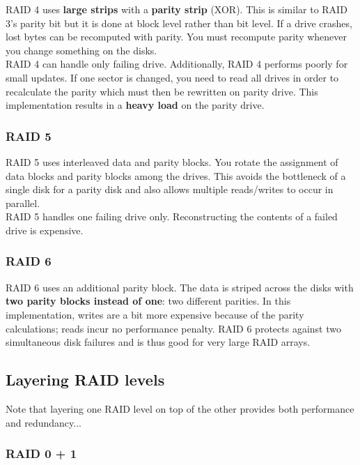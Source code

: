\documentclass{article}
\newcommand{\bold}[1]{\textbf{#1}}
\begin{document}
RAID 4 uses \bold{large strips} with a \bold{parity strip} (XOR). This is similar to RAID 3's parity bit but it is done at block level rather than bit level. If a drive crashes, lost bytes can be recomputed with parity. You must recompute parity whenever you change something on the disks. \\ 

RAID 4 can handle only failing drive. Additionally, RAID 4 performs poorly for small updates. If one sector is changed, you need to read all drives in order to recalculate the parity which must then be rewritten on parity drive. This implementation results in a \bold{heavy load} on the parity drive. 

\subsubsection{RAID 5}

RAID 5 uses interleaved data and parity blocks. You rotate the assignment of data blocks and parity blocks among the drives. This avoids the bottleneck of a single disk for a parity disk and also allows multiple reads/writes to occur in parallel. \\ 

RAID 5 handles one failing drive only. Reconstructing the contents of a failed drive is expensive. 

\subsubsection{RAID 6}

RAID 6 uses an additional parity block. The data is striped across the disks with \bold{two parity blocks instead of one}: two different parities. In this implementation, writes are a bit more expensive because of the parity calculations; reads incur no performance penalty. RAID 6 protects against two simultaneous disk failures and is thus good for very large RAID arrays. \\ 

\subsection{Layering RAID levels}

Note that layering one RAID level on top of the other provides both performance and redundancy...

\subsubsection{RAID 0 + 1}
\end{document}
